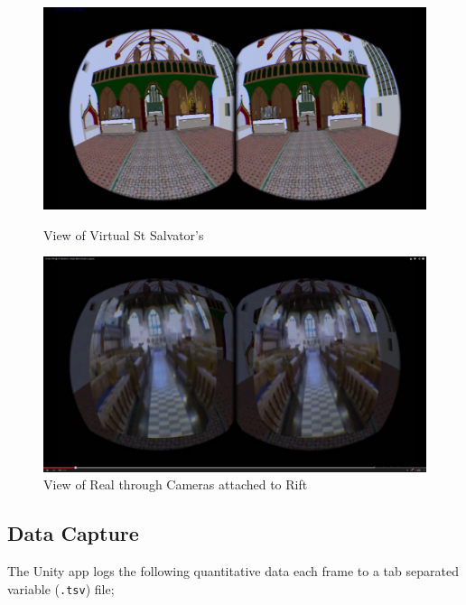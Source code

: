 \documentclass[conference]{acmsiggraph}
\begin{document}
\begin{figure}[tp!]
	\centering
	\begin{minipage}[t]{\linewidth}
		\centering
		\includegraphics[width=\linewidth]{images/2chapels}
		\caption{View of Virtual St Salvator's} 
		\label{chapel1}
	\end{minipage}
	\begin{minipage}[t]{\linewidth}
		\centering
		\includegraphics[width=\linewidth]{images/tankview}
		\caption{View of Real through Cameras attached to Rift} 
		\label{chapel2}
	\end{minipage}
\end{figure}

\subsection{Data Capture}
The Unity app logs the following quantitative data each frame to a tab separated variable (\texttt{.tsv}) file;
\end{document}
